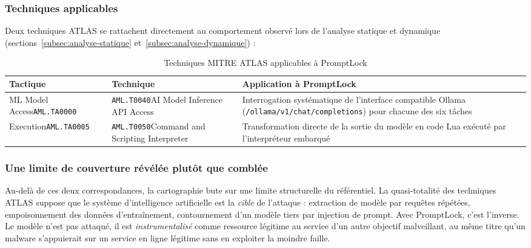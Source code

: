 \subsubsection{Techniques applicables}

Deux techniques ATLAS se rattachent directement au comportement observé lors de
l'analyse statique et dynamique (sections~\ref{subsec:analyse-statique}
et~\ref{subsec:analyse-dynamique}) :

\begin{table}[htbp]
  \centering
  \small
  \setlength{\parindent}{0pt}
  \setlength{\tabcolsep}{5pt}
  \renewcommand{\arraystretch}{1.25}
  \caption{Techniques MITRE ATLAS applicables à PromptLock}
  \label{tab:atlas}
  \begin{tabularx}{\linewidth}{@{}
      >{\RaggedRight\arraybackslash}p{3.0cm}
      >{\RaggedRight\arraybackslash}p{4.2cm}
      >{\RaggedRight\arraybackslash}X @{}}
    \toprule
    \textbf{Tactique} & \textbf{Technique} & \textbf{Application à PromptLock} \\
    \midrule
    ML Model Access\newline\texttt{AML.TA0000}
      & \texttt{AML.T0040}\newline AI Model Inference API Access
      & Interrogation systématique de l'interface compatible Ollama
        (\texttt{/ollama/v1/\allowbreak chat/completions}) pour chacune des six
        tâches \\
    \addlinespace
    Execution\newline\texttt{AML.TA0005}
      & \texttt{AML.T0050}\newline Command and Scripting Interpreter
      & Transformation directe de la sortie du modèle en code Lua exécuté par
        l'interpréteur embarqué \\
    \bottomrule
  \end{tabularx}
\end{table}

\subsubsection{Une limite de couverture révélée plutôt que comblée}

Au-delà de ces deux correspondances, la cartographie bute sur une limite structurelle du
référentiel. La quasi-totalité des techniques ATLAS suppose que le système d'intelligence
artificielle est la \emph{cible} de l'attaque : extraction de modèle par requêtes
répétées, empoisonnement des données d'entraînement, contournement d'un modèle tiers par
injection de prompt. Avec PromptLock, c'est l'inverse. Le modèle n'est pas attaqué, il est
\emph{instrumentalisé} comme ressource légitime au service d'un autre objectif
malveillant, au même titre qu'un malware s'appuierait sur un service en ligne légitime
sans en exploiter la moindre faille.

